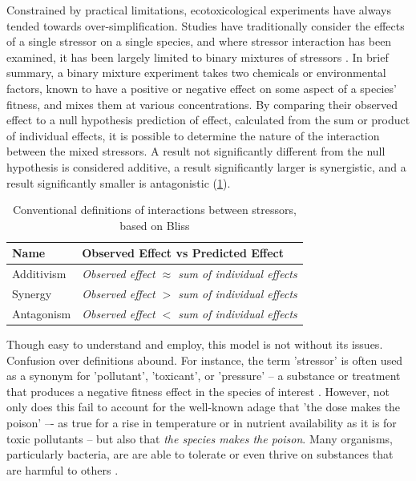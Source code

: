 \documentclass[10pt]{article}
\begin{document}
Constrained by practical limitations, ecotoxicological experiments have always tended towards over-simplification. Studies have traditionally consider the effects of a single stressor on a single species, and where stressor interaction has been examined, it has been largely limited to binary mixtures of stressors \cite{Peterson2017}. In brief summary, a binary mixture experiment takes two chemicals or environmental factors, known to have a positive or negative effect on some aspect of a species' fitness, and mixes them at various concentrations. By comparing their observed effect to a null hypothesis prediction of effect, calculated from the sum or product of individual effects, it is possible to determine the nature of the interaction between the mixed stressors. A result not significantly different from the null hypothesis is considered additive, a result significantly larger is synergistic, and a result significantly smaller is antagonistic (\cref{tab:simple_interactions}). 

\begin{table}[ht]
\centering
\begin{tabular}{l l}
\toprule 
\textbf{Name} & \textbf{Observed Effect vs Predicted Effect} \\
\midrule
\rowcolor{gggrey}   Additivism      &   \textit{Observed effect $\approx$ sum of individual effects} \\
                    Synergy         &   \textit{Observed effect $>$ sum of individual effects} \\
\rowcolor{gggrey}   Antagonism      &   \textit{Observed effect $<$ sum of individual effects} \\
\bottomrule
\end{tabular}
\caption{Conventional definitions of interactions between stressors, based on Bliss \cite{Bliss1939}}
\label{tab:simple_interactions}
\end{table}

Though easy to understand and employ, this model is not without its issues. Confusion over definitions abound. For instance, the term 'stressor' is often used as a synonym for 'pollutant', 'toxicant', or 'pressure' -- a substance or treatment that produces a negative fitness effect in the species of interest \cite{Piggott2015}. However, not only does this fail to account for the well-known adage that 'the dose makes the poison'\cite{OGParacelsus} –- as true for a rise in temperature or in nutrient availability as it is for toxic pollutants -- but also that \textit{the species makes the poison}. Many organisms, particularly bacteria, are are able to tolerate or even thrive on substances that are harmful to others \cite{Malik2004,Gadd2009}. 
\end{document}
